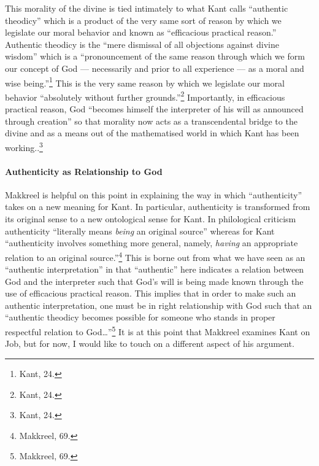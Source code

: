 \documentclass[12pt]{article}
\begin{document}
	This morality of the divine is tied intimately to what Kant calls ``authentic theodicy'' which is a product of the very same sort of reason by which we legislate our moral behavior and known as ``efficacious practical reason.'' Authentic theodicy is the ``mere dismissal of all objections against divine wisdom'' which is a ``pronouncement of the same reason through which we form our concept of God --- necessarily and prior to all experience --- as a moral and wise being.''\footnote{Kant, 24.} This is the very same reason by which we legislate our moral behavior ``absolutely without further grounds.''\footnote{Kant, 24.} Importantly, in efficacious practical reason, God ``becomes himself the interpreter of his will as announced through creation'' so that morality now acts as a transcendental bridge to the divine and as a means out of the mathematised world in which Kant has been working..\footnote{Kant, 24.}  
	
	\paragraph*{Authenticity as Relationship to God} Makkreel is helpful on this point in explaining the way in which ``authenticity'' takes on a new meaning for Kant. In particular, authenticity is transformed from its original sense to a new ontological sense for Kant. In philological criticism authenticity ``literally means \emph{being} an original source'' whereas for Kant ``authenticity involves something more general, namely, \emph{having} an appropriate relation to an original source.''\footnote{Makkreel, 69.} This is borne out from what we have seen as an ``authentic interpretation'' in that ``authentic'' here indicates a relation between God and the interpreter such that God's will is being made known through the use of efficacious practical reason. This implies that in order to make such an authentic interpretation, one must be in right relationship with God such that an ``authentic theodicy becomes possible for someone who stands in proper respectful relation to God\ldots''\footnote{Makkreel, 69.} It is at this point that Makkreel examines Kant on Job, but for now, I would like to touch on a different aspect of his argument.
	
\end{document}

